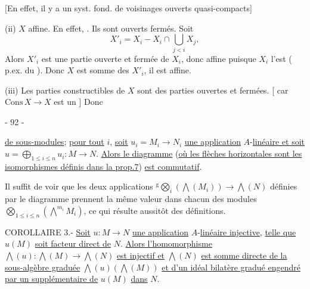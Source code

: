 [En effet, il y a un syst. fond. de voisinages ouverts quasi-compacts]

(ii) $X$  affine. En effet,  .  Ils sont ouverts  fermés. Soit
\[
X'_i=X_i-X_i\cap\bigcup_{j<i}X_j,
\]
Alors $X'_i$ est une partie ouverte et fermée de $X_i$, donc affine puisque $X_i$ l'est ( p.ex. du   ). Donc $X$ est  somme des $X'_i$, il est affine.

(iii) Les parties constructibles de $X$ sont des parties ouvertes et fermées. [  car $\mathrm{Cons}\,X\to X$ est un  ] Donc

\begin{center}- 92 -\end{center}

\uline{de sous-modules}; \uline{pour tout} $i$, \uline{soit} $u_i=M_i\to N_i$ \uline{une application} $A$-\uline{linéaire et soit} $u=\bigoplus_{1\leq i\leq n}u_i:M\to N$. \uline{Alors le diagramme}
(\uline{où les flèches horizontales sont les isomorphismes définis dans la prop.7}) \uline{est commutatif}.

Il suffit de voir que les deux applications ${}^{\mathrm g}\!\bigotimes_i(\bigwedge(M_i))\to\bigwedge(N)$ définies par le diagramme prennent la même valeur dans chacun des modules $\bigotimes_{1\leq i\leq n}(\mathop{\bigwedge}\limits^{m_i}M_i)$, ce qui résulte aussitôt des définitions.

COROLLAIRE 3.- \uline{Soit} $u:M\to N$ \uline{une application} $A$-\uline{linéaire injective}, \uline{telle que} $u(M)$ \uline{soit facteur direct de} $N$. \uline{Alors l'homomorphisme} $\bigwedge(u):\bigwedge(M)\to\bigwedge(N)$ \uline{est injectif et} $\bigwedge(N)$ \uline{est somme directe de la sous-algèbre graduée} $\bigwedge(u)(\bigwedge(M))$ \uline{et d'un idéal bilatère gradué engendré par un supplémentaire de} $u(M)$ \uline{dans} $N$.

